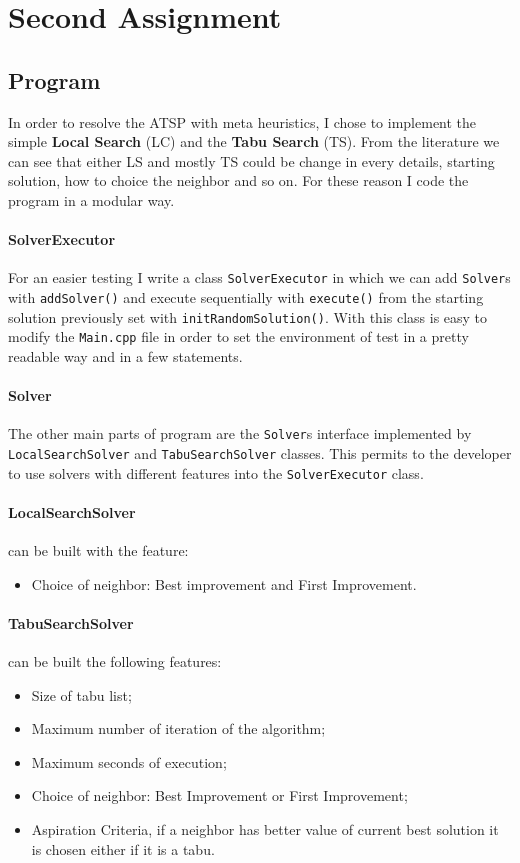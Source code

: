 \section{Second Assignment}

\subsection{Program}
	In order to resolve the ATSP with meta heuristics, I chose to implement the simple \textbf{Local Search} (LC) and the \textbf{Tabu Search} (TS).	From the literature we can see that either LS and mostly TS could be change in every details, starting solution, how to choice the neighbor and so on. For these reason I code the program in a modular way.
	
	\paragraph{SolverExecutor} For an easier testing I write a class \verb|SolverExecutor| in which we can add \verb|Solver|s with \verb|addSolver()| and execute sequentially with \verb|execute()| from the starting solution previously set with \verb|initRandomSolution()|. With this class is easy to modify the \verb|Main.cpp| file in order to set the environment of test in a pretty readable way and in a few statements.
	
	\paragraph{Solver} The other main parts of program are the \verb|Solver|s interface implemented by \verb|LocalSearchSolver| and \verb|TabuSearchSolver| classes. This permits to the developer to use solvers with different features into the \verb|SolverExecutor| class.
	
	\paragraph{LocalSearchSolver} can be built with the feature:
	\begin{itemize}
		\item Choice of neighbor: Best improvement and First Improvement.
	\end{itemize}
	
	\paragraph{TabuSearchSolver} can be built the following features:
	\begin{itemize}
		\item Size of tabu list;
		\item Maximum number of iteration of the algorithm;
		\item Maximum seconds of execution;
		\item Choice of neighbor: Best Improvement or First Improvement;
		\item Aspiration Criteria, if a neighbor has better value of current best solution it is chosen either if it is a tabu.
	\end{itemize}

